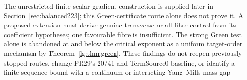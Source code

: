 The unrestricted finite scalar-gradient construction is supplied later in
Section~\ref{sec:balanced223}; this Green-certificate route alone does not prove it.
A proposed extension must derive genuine transverse or all-fibre control
from its coefficient hypotheses; one favourable fibre is insufficient.
The strong Green test alone is abandoned at and below the critical
exponent as a uniform target-order mechanism by Theorem~\ref{lg:thm:green}.
These findings do not reopen previously stopped routes, change PR29's
20/41 and TermSource0 baseline, or identify a finite sequence bound with
a continuum or interacting Yang--Mills mass gap.

